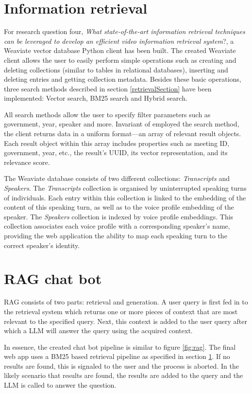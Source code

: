 \documentclass[twoside]{uva-inf-bachelor-thesis}
\begin{document}
\section{Information retrieval}\label{sec:weaviate}
For research question four, \textit{What state-of-the-art information retrieval techniques can be leveraged to develop an efficient video information retrieval system}?, a Weaviate vector database Python client has been built.
The created Weaviate client allows the user to easily perform simple operations such as creating and deleting collections (similar to tables in relational databases), inserting and deleting entries and getting collection metadata. 
Besides these basic operations, three search methods described in section \ref{retrievalSection} have been implemented: Vector search, BM25 search and Hybrid search.

All search methods allow the user to specify filter parameters such as government, year, speaker and more. Invariant of employed the search method, the client returns data in a uniform format—an array of relevant result objects. Each result object within this array includes properties such as meeting ID, government, year, etc., the result's UUID, its vector representation, and its relevance score.

The Weaviate database consists of two different collections: \textit{Transcripts} and \textit{Speakers}. The \textit{Transcripts} collection is organised by uninterrupted speaking turns of individuals. Each entry within this collection is linked to the embedding of the content of this speaking turn, as well as to the voice profile embedding of the speaker.
The \textit{Speakers} collection is indexed by voice profile embeddings. This collection associates each voice profile with a corresponding speaker's name, providing the web application the ability to map each speaking turn to the correct speaker's identity.


\section{RAG chat bot}

RAG consists of two parts: retrieval and generation. A user query is first fed in to the retrieval system which returns one or more pieces of context that are most relevant to the specified query. Next, this context is added to the user query after which a LLM will answer the query using the acquired context. 

In essence, the created chat bot pipeline is similar to figure \ref{fig:rag}. The final web app uses a BM25 based retrieval pipeline as specified in section \ref{sec:weaviate}. If no results are found, this is signaled to the user and the process is aborted. In the likely scenario that results are found, the results are added to the query and the LLM is called to answer the question.
\end{document}
